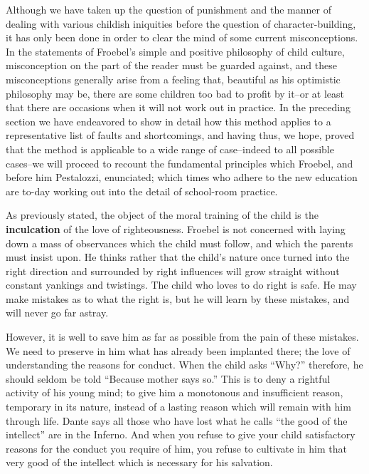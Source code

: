 \bigskip
\begin{linenumbers*}
\modulolinenumbers[5]
\indent Although we have taken up the question of punishment and the manner of dealing with various childish iniquities before the question of character-building, it has only been done in order to clear the mind of some current misconceptions. In the statements of Froebel's simple and positive philosophy of child culture, misconception on the part of the reader must be guarded against, and these misconceptions generally arise from a feeling that, beautiful as his optimistic philosophy may be, there are some children too bad to profit by it--or at least that there are occasions when it will not work out in practice. In the preceding section we have endeavored to show in detail how this method applies to a representative list of faults and shortcomings, and having thus, we hope, proved that the method is applicable to a wide range of case--indeed to all possible cases--we will proceed to recount the fundamental principles which Froebel, and before him Pestalozzi, enunciated; which times who adhere to the new education are to-day working out into the detail of school-room practice.

\indent  As previously stated, the object of the moral training of the child is the \textbf{inculcation} of the love of righteousness. Froebel is not concerned with laying down a mass of observances which the child must follow, and which the parents must insist upon. He thinks rather that the child's nature once turned into the right direction and surrounded by right influences will grow straight without constant yankings and twistings. The child who loves to do right is safe. He may make mistakes as to what the right is, but he will learn by these mistakes, and will never go far astray.

\indent However, it is well to save him as far as possible from the pain of these mistakes. We need to preserve in him what has already been implanted there; the love of understanding the reasons for conduct. When the child asks ``Why?'' therefore, he should seldom be told ``Because mother says so.'' This is to deny a rightful activity of his young mind; to give him a monotonous and insufficient reason, temporary in its nature, instead of a lasting reason which will remain with him through life. Dante says all those who have lost what he calls ``the good of the intellect'' are in the Inferno. And when you refuse to give your child satisfactory reasons for the conduct you require of him, you refuse to cultivate in him that very good of the intellect which is necessary for his salvation.


\end{linenumbers*}
